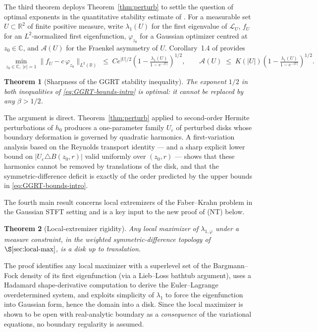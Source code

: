 \documentclass[a4paper,11pt,reqno]{amsart}
\numberwithin{equation}{section}
\theoremstyle{plain} %
\newtheorem{theorem}{Theorem}
\theoremstyle{definition} %
\theoremstyle{remark}
\newcommand{\R}{\mathbb{R}}
\newcommand{\C}{\mathbb{C}}
\begin{document}
The third theorem deploys Theorem~\ref{thm:perturb} to settle the question of optimal exponents in the quantitative stability estimate of \cite{Gomez-Guerra-Ramos-Tilli}. For a measurable set $U\subset\R^2$ of finite positive measure, write $\lambda_1(U)$ for the first eigenvalue of $\mathcal L_U$, $f_U$ for an $L^2$-normalized first eigenfunction, $\varphi_{z_0}$ for a Gaussian optimizer centred at $z_0\in\C$, and $\mathcal A(U)$ for the Fraenkel asymmetry of $U$. Corollary~1.4 of \cite{Gomez-Guerra-Ramos-Tilli} provides
\begin{equation}\label{eq:GGRT-bounds-intro}
\min_{z_0\in\C,\ |c|=1}\|f_U-c\,\varphi_{z_0}\|_{L^2(\R)}
\;\le\;
C e^{|U|/2}\!\left(1-\tfrac{\lambda_1(U)}{1-e^{-|U|}}\right)^{\!1/2},
\qquad
\mathcal A(U) \;\le\; K(|U|)\!\left(1-\tfrac{\lambda_1(U)}{1-e^{-|U|}}\right)^{\!1/2}.
\end{equation}

\begin{theorem}[Sharpness of the GGRT stability inequality]\label{thm:GGRT-sharp}
The exponent $1/2$ in both inequalities of \eqref{eq:GGRT-bounds-intro} is optimal: it cannot be replaced by any $\beta>1/2$.
\end{theorem}

The argument is direct. Theorem~\ref{thm:perturb} applied to second-order Hermite perturbations of $h_0$ produces a one-parameter family $U_\varepsilon$ of perturbed disks whose boundary deformation is governed by quadratic harmonics. A first-variation analysis based on the Reynolds transport identity --- and a sharp explicit lower bound on $|U_\varepsilon\triangle B(z_0,r)|$ valid uniformly over $(z_0,r)$ --- shows that these harmonics cannot be removed by translations of the disk, and that the symmetric-difference deficit is exactly of the order predicted by the upper bounds in \eqref{eq:GGRT-bounds-intro}.

The fourth main result concerns local extremizers of the Faber--Krahn problem in the Gaussian STFT setting and is a key input to the new proof of (NT) below.

\begin{theorem}[Local-extremizer rigidity]\label{thm:local-maximizers}
Any local maximizer of $\lambda_{1,\varphi}$ under a measure constraint, in the weighted symmetric-difference topology of $\S\ref{sec:local-max}$, is a disk up to translation.
\end{theorem}

The proof identifies any local maximizer with a superlevel set of the Bargmann--Fock density of its first eigenfunction (via a Lieb--Loss bathtub argument), uses a Hadamard shape-derivative computation to derive the Euler--Lagrange overdetermined system, and exploits simplicity of $\lambda_1$ to force the eigenfunction into Gaussian form, hence the domain into a disk. Since the local maximizer is shown to be open with real-analytic boundary as a \emph{consequence} of the variational equations, no boundary regularity is assumed.
\end{document}
